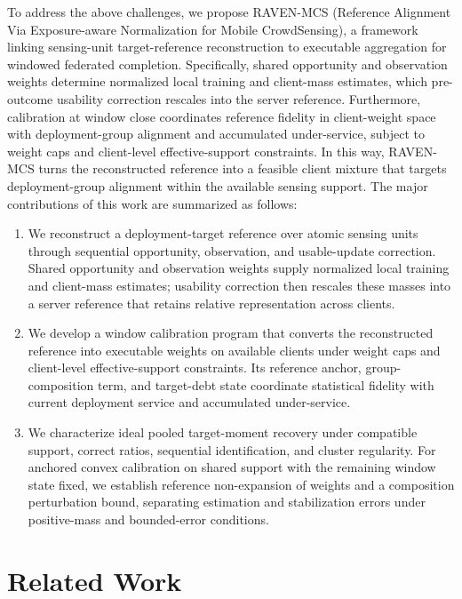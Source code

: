 \documentclass[letterpaper,journal]{IEEEtran}
\begin{document}
To address the above challenges, we propose RAVEN-MCS (Reference Alignment Via Exposure-aware Normalization for Mobile CrowdSensing), a framework linking sensing-unit target-reference reconstruction to executable aggregation for windowed federated completion.
Specifically, shared opportunity and observation weights determine normalized local training and client-mass estimates, which pre-outcome usability correction rescales into the server reference.
Furthermore, calibration at window close coordinates reference fidelity in client-weight space with deployment-group alignment and accumulated under-service, subject to weight caps and client-level effective-support constraints.
In this way, RAVEN-MCS turns the reconstructed reference into a feasible client mixture that targets deployment-group alignment within the available sensing support.
The major contributions of this work are summarized as follows:
\begin{enumerate}
\item We reconstruct a deployment-target reference over atomic sensing units through sequential opportunity, observation, and usable-update correction. Shared opportunity and observation weights supply normalized local training and client-mass estimates; usability correction then rescales these masses into a server reference that retains relative representation across clients.
\item We develop a window calibration program that converts the reconstructed reference into executable weights on available clients under weight caps and client-level effective-support constraints. Its reference anchor, group-composition term, and target-debt state coordinate statistical fidelity with current deployment service and accumulated under-service.
\item We characterize ideal pooled target-moment recovery under compatible support, correct ratios, sequential identification, and cluster regularity. For anchored convex calibration on shared support with the remaining window state fixed, we establish reference non-expansion of weights and a composition perturbation bound, separating estimation and stabilization errors under positive-mass and bounded-error conditions.
\end{enumerate}

\section{Related Work}
\label{sec:related_work}
\end{document}
